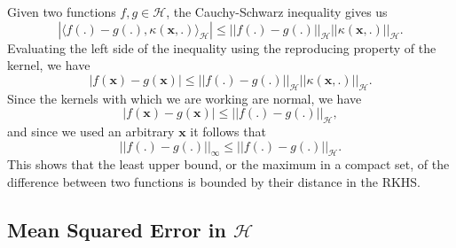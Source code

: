 Given two functions $f,g \in \mathcal{H}$, the Cauchy-Schwarz inequality gives us
\begin{equation}
    |\langle f(.) - g(.), \kappa(\mathbf{x},.) \rangle_{\mathcal{H}}| \leq ||f(.)-g(.)||_{\mathcal{H}}||\kappa(\mathbf{x},.)||_{\mathcal{H}}.
\end{equation}
Evaluating the left side of the inequality using the reproducing property of the kernel, we have
\begin{equation}
    |f(\mathbf{x}) - g(\mathbf{x})| \leq ||f(.)-g(.)||_{\mathcal{H}}||\kappa(\mathbf{x},.)||_{\mathcal{H}}.
\end{equation}
Since the kernels with which we are working are normal, we have
\begin{equation}
    |f(\mathbf{x}) - g(\mathbf{x})| \leq ||f(.)-g(.)||_{\mathcal{H}},
\end{equation}
and since we used an arbitrary $\mathbf{x}$ it follows that
\begin{equation}
    ||f(.) - g(.)||_\infty \leq ||f(.)-g(.)||_{\mathcal{H}}.
\end{equation}
This shows that the least upper bound, or the maximum in a compact set, of the difference between two functions is bounded by their distance in the RKHS.

\subsection{Mean Squared Error in $\mathcal{H}$}


